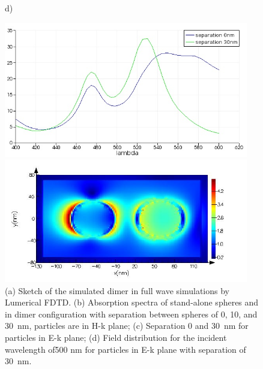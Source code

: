 \documentclass[a4paper]{article}
\begin{document}
\begin{figure}
\begin{minipage}[h]{0.49\textwidth}
  \end{minipage}
  \begin{minipage}[h]{0.49\textwidth}    \begin{flushleft}     d)   \end{flushleft}
  \end{minipage}
  \begin{minipage}[h]{0.49\textwidth} 
    \includegraphics[width=0.95\textwidth]{fdtd-spectra-Ek}
  \end{minipage}
  \begin{minipage}[h]{0.49\textwidth} 
    \includegraphics[width=0.95\textwidth]{fdtd-field}
  \end{minipage}
    \caption{(a) Sketch of the simulated dimer in full wave
      simulations by Lumerical FDTD. (b) Absorption spectra of
      stand-alone spheres and in dimer configuration with separation
      between spheres of 0, 10, and 30~nm, particles are in H-k plane;
      (c) Separation 0 and 30~nm for particles in E-k plane; (d) Field
      distribution for the incident wavelength of500 nm for particles
      in E-k plane with separation of 30~nm.\label{fig:fdtd}}%
\end{figure}
\end{document}
